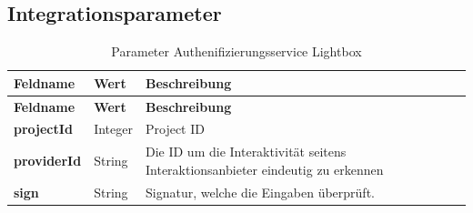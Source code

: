 \subsection{Integrationsparameter}\label{integrationsparameter}

\begin{longtable}[c]{@{}lll@{}}
\caption{Parameter Authenifizierungsservice Lightbox}\tabularnewline
\toprule
\begin{minipage}[b]{0.30\columnwidth}\raggedright\strut
\textbf{Feldname}
\strut\end{minipage} &
\begin{minipage}[b]{0.17\columnwidth}\raggedright\strut
\textbf{Wert}
\strut\end{minipage} &
\begin{minipage}[b]{0.43\columnwidth}\raggedright\strut
\textbf{Beschreibung}
\strut\end{minipage}\tabularnewline
\midrule
\endfirsthead
\toprule
\begin{minipage}[b]{0.30\columnwidth}\raggedright\strut
\textbf{Feldname}
\strut\end{minipage} &
\begin{minipage}[b]{0.17\columnwidth}\raggedright\strut
\textbf{Wert}
\strut\end{minipage} &
\begin{minipage}[b]{0.43\columnwidth}\raggedright\strut
\textbf{Beschreibung}
\strut\end{minipage}\tabularnewline
\midrule
\endhead
\begin{minipage}[t]{0.30\columnwidth}\raggedright\strut
\textbf{projectId}
\strut\end{minipage} &
\begin{minipage}[t]{0.17\columnwidth}\raggedright\strut
Integer
\strut\end{minipage} &
\begin{minipage}[t]{0.43\columnwidth}\raggedright\strut
Project ID
\strut\end{minipage}\tabularnewline
\begin{minipage}[t]{0.30\columnwidth}\raggedright\strut
\textbf{providerId}
\strut\end{minipage} &
\begin{minipage}[t]{0.17\columnwidth}\raggedright\strut
String
\strut\end{minipage} &
\begin{minipage}[t]{0.43\columnwidth}\raggedright\strut
Die ID um die Interaktivität seitens Interaktionsanbieter eindeutig zu
erkennen
\strut\end{minipage}\tabularnewline
\begin{minipage}[t]{0.30\columnwidth}\raggedright\strut
\textbf{sign}
\strut\end{minipage} &
\begin{minipage}[t]{0.17\columnwidth}\raggedright\strut
String
\strut\end{minipage} &
\begin{minipage}[t]{0.43\columnwidth}\raggedright\strut
Signatur, welche die Eingaben überprüft.
\strut\end{minipage}\tabularnewline
\bottomrule
\end{longtable}

